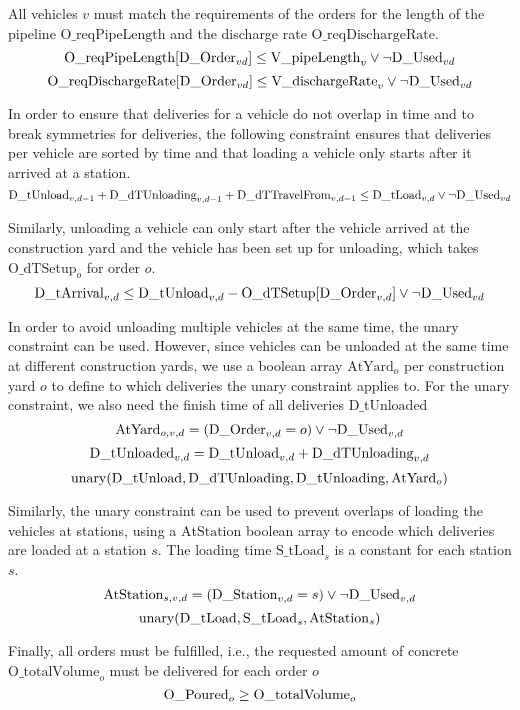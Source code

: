 \documentclass[a4paper]{article}
\begin{document}
All vehicles $v$ must match the requirements of the orders for the length of the pipeline $\text{O\_reqPipeLength}$ and the discharge rate $\text{O\_reqDischargeRate}$.
\[
\text{O\_reqPipeLength}[ \text{D\_Order}_{vd} ] \leq \text{V\_pipeLength}_v \vee \neg \text{D\_Used}_{vd} 
\]
\[
\text{O\_reqDischargeRate}[ \text{D\_Order}_{vd} ] \leq \text{V\_dischargeRate}_v \vee \neg \text{D\_Used}_{vd} 
\]

In order to ensure that deliveries for a vehicle do not overlap in time and to break symmetries for deliveries, the following constraint ensures
that deliveries per vehicle are sorted by time and that loading a vehicle only starts after it arrived at a station.
\[
\text{D\_tUnload}_{v,d-1} + \text{D\_dTUnloading}_{v,d-1} + \text{D\_dTTravelFrom}_{v,d-1} \leq \text{D\_tLoad}_{v,d} \vee \neg \text{D\_Used}_{vd}
\]

Similarly, unloading a vehicle can only start after the vehicle arrived at the construction yard and the vehicle has been set up for unloading, which takes $\text{O\_dTSetup}_o$ for order $o$.
\[
\text{D\_tArrival}_{v,d} \leq \text{D\_tUnload}_{v,d} - \text{O\_dTSetup}[ \text{D\_Order}_{v,d} ] \vee \neg \text{D\_Used}_{vd}
\]

In order to avoid unloading multiple vehicles at the same time, the unary constraint can be used. However, since vehicles can be 
unloaded at the same time at different construction yards, we use a boolean array $\text{AtYard}_o$ per construction yard $o$ to define to which deliveries
the unary constraint applies to. For the unary constraint, we also need the finish time of all deliveries $\text{D\_tUnloaded}$
\[
\text{AtYard}_{o,v,d} = (\text{D\_Order}_{v,d} = o) \vee \neg \text{D\_Used}_{v,d}
\]
\[
\text{D\_tUnloaded}_{v,d} = \text{D\_tUnload}_{v,d} + \text{D\_dTUnloading}_{v,d}
\]
\[
\text{unary}(\text{D\_tUnload}, \text{D\_dTUnloading}, \text{D\_tUnloading}, \text{AtYard}_o)
\]

Similarly, the unary constraint can be used to prevent overlaps of loading the vehicles at stations, using a $\text{AtStation}$ boolean array to encode
which deliveries are loaded at a station $s$. The loading time $\text{S\_tLoad}_s$ is a constant for each station $s$.
\[
\text{AtStation}_{s,v,d} = (\text{D\_Station}_{v,d} = s) \vee \neg \text{D\_Used}_{v,d}
\]
\[
\text{unary}(\text{D\_tLoad}, \text{S\_tLoad}_s, \text{AtStation}_s)
\]

\newcommand{\OtotalVolume}{\text{O\_totalVolume}}

Finally, all orders must be fulfilled, i.e., the requested amount of concrete $\OtotalVolume_o$ must be delivered for each order $o$
\[
\OPoured_o \geq \OtotalVolume_o
\]
\end{document}
